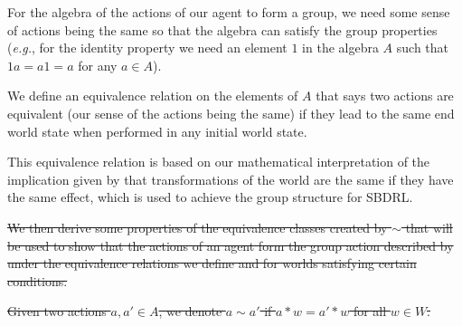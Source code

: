 
For the algebra of the actions of our agent to form a group, we need some sense of actions being the same so that the algebra can satisfy the group properties (\textit{e.g.}, for the identity property we need an element $1$ in the algebra $A$ such that $1a = a1 = a$ for any $a \in A$).

We define an equivalence relation on the elements of $A$ that says two actions are equivalent (our sense of the actions being the same) if they lead to the same end world state when performed in any initial world state.

This equivalence relation is based on our mathematical interpretation of the implication given by \cite{Higgins2018} that transformations of the world are the same if they have the same effect, which is used to achieve the group structure for SBDRL.



\sout{
We then derive some properties of the equivalence classes created by $\sim$ that will be used to show that the actions of an agent form the group action described by \cite{Higgins2018} under the equivalence relations we define and for worlds satisfying certain conditions.
}

\begin{definition}
    \sout{Given two actions $a, a' \in A$, we denote $a \sim a'$ if $a * w = a' * w$ for all $w \in W$.
    }
\end{definition}

